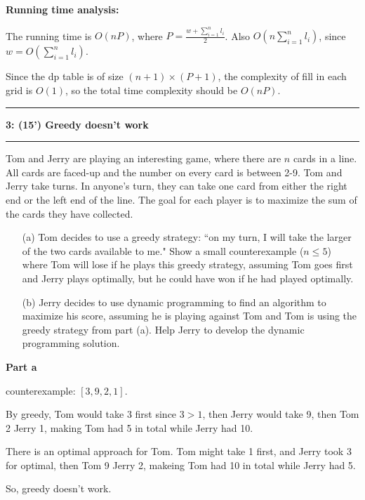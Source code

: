 \documentclass{article}
\newcommand\question[2]{\vspace{.25in}\hrule\textbf{#1: #2}\vspace{.5em}\hrule\vspace{.10in}}
\begin{document}
\textbf{Running time analysis:}

The running time is $O(nP)$, where $P=\frac{w+\sum_{i=1}^nl_i}{2}$. Also $O(n\sum_{i=1}^nl_i)$, since $w=O(\sum_{i=1}^nl_i)$.

Since the dp table is of size $(n+1)\times (P+1)$, the complexity of fill in each grid is $O(1)$, so the total time complexity should be $O(nP)$.

\pagebreak

\question{3}{(15') Greedy doesn't work}

Tom and Jerry are playing an interesting game, where there are $n$ cards in a line. All cards are faced-up and the number on every card is between 2-9. Tom and Jerry take turns. In anyone's turn, they can take one card from either the right end or the left end of the line. The goal for each player is to maximize the sum of the cards they have collected.

\begin{enumerate}
	\item[(a)] Tom decides to use a greedy strategy: ``on my turn, I will take the larger of the two cards available to me." Show a small counterexample ($n\leq 5$) where Tom will lose if he plays this greedy strategy, assuming Tom goes first and Jerry plays optimally, but he could have won if he had played optimally.
	\item[(b)] Jerry decides to use dynamic programming to find an algorithm to maximize his score, assuming he is playing against Tom and Tom is using the greedy strategy from part (a). Help Jerry to develop the dynamic programming solution.
\end{enumerate}

\textbf{Part a}

counterexample: $[3,9,2,1]$.

By greedy, Tom would take 3 first since $3>1$, then Jerry would take 9, then Tom 2 Jerry 1, making Tom had 5 in total while Jerry had 10.

There is an optimal approach for Tom. Tom might take 1 first, and Jerry took 3 for optimal, then Tom 9 Jerry 2, makeing Tom had 10 in total while Jerry had 5.

So, greedy doesn't work.
\end{document}
